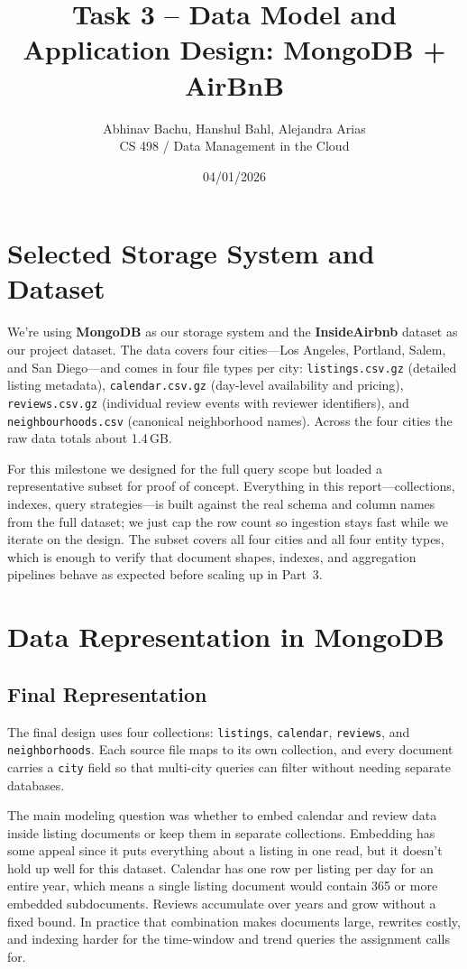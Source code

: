 \documentclass[10pt]{article}
\title{\vspace{-1.5em}Task 3 -- Data Model and Application Design: MongoDB + AirBnB\vspace{-0.5em}}
\author{Abhinav Bachu, Hanshul Bahl, Alejandra Arias\\CS 498 / Data Management in the Cloud}
\date{04/01/2026}
\begin{document}
\maketitle
\vspace{-1.8em}

\section{Selected Storage System and Dataset}

We're using \textbf{MongoDB} as our storage system and the \textbf{InsideAirbnb} dataset as our project dataset. The data covers four cities---Los Angeles, Portland, Salem, and San Diego---and comes in four file types per city: \texttt{listings.csv.gz} (detailed listing metadata), \texttt{calendar.csv.gz} (day-level availability and pricing), \texttt{reviews.csv.gz} (individual review events with reviewer identifiers), and \texttt{neighbourhoods.csv} (canonical neighborhood names). Across the four cities the raw data totals about 1.4\,GB.

For this milestone we designed for the full query scope but loaded a representative subset for proof of concept. Everything in this report---collections, indexes, query strategies---is built against the real schema and column names from the full dataset; we just cap the row count so ingestion stays fast while we iterate on the design. The subset covers all four cities and all four entity types, which is enough to verify that document shapes, indexes, and aggregation pipelines behave as expected before scaling up in Part~3.


\section{Data Representation in MongoDB}

\subsection{Final Representation}

The final design uses four collections: \texttt{listings}, \texttt{calendar}, \texttt{reviews}, and \texttt{neighborhoods}. Each source file maps to its own collection, and every document carries a \texttt{city} field so that multi-city queries can filter without needing separate databases.

The main modeling question was whether to embed calendar and review data inside listing documents or keep them in separate collections. Embedding has some appeal since it puts everything about a listing in one read, but it doesn't hold up well for this dataset. Calendar has one row per listing per day for an entire year, which means a single listing document would contain 365 or more embedded subdocuments. Reviews accumulate over years and grow without a fixed bound. In practice that combination makes documents large, rewrites costly, and indexing harder for the time-window and trend queries the assignment calls for.
\end{document}
